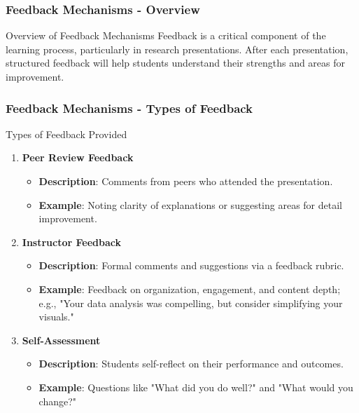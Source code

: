 \documentclass[aspectratio=169]{beamer}
\begin{document}
\begin{frame}[fragile]
    \frametitle{Feedback Mechanisms - Overview}
    \begin{block}{Overview of Feedback Mechanisms}
        Feedback is a critical component of the learning process, particularly in research presentations. 
        After each presentation, structured feedback will help students understand their strengths and areas for improvement.
    \end{block}
\end{frame}

\begin{frame}[fragile]
    \frametitle{Feedback Mechanisms - Types of Feedback}
    \begin{block}{Types of Feedback Provided}
        \begin{enumerate}
            \item \textbf{Peer Review Feedback}
                \begin{itemize}
                    \item \textbf{Description}: Comments from peers who attended the presentation.
                    \item \textbf{Example}: Noting clarity of explanations or suggesting areas for detail improvement.
                \end{itemize}

            \item \textbf{Instructor Feedback}
                \begin{itemize}
                    \item \textbf{Description}: Formal comments and suggestions via a feedback rubric.
                    \item \textbf{Example}: Feedback on organization, engagement, and content depth; e.g., "Your data analysis was compelling, but consider simplifying your visuals."
                \end{itemize}

            \item \textbf{Self-Assessment}
                \begin{itemize}
                    \item \textbf{Description}: Students self-reflect on their performance and outcomes.
                    \item \textbf{Example}: Questions like "What did you do well?" and "What would you change?"
                \end{itemize}
        \end{enumerate}
    \end{block}
\end{frame}
\end{document}
